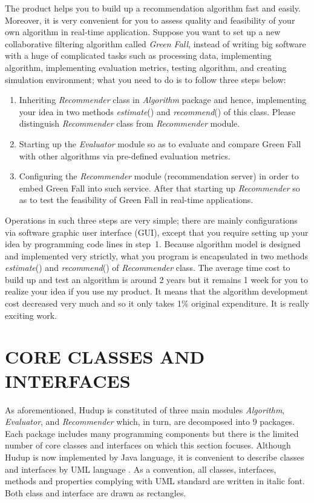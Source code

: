 \documentclass[a4paper,twoside]{article}
\begin{document}
The product helps you to build up a recommendation algorithm fast and easily. Moreover, it is very convenient for you to assess quality and feasibility of your own algorithm in real-time application. Suppose you want to set up a new collaborative filtering algorithm called \textit{Green Fall}, instead of writing big software with a huge of complicated tasks such as processing data, implementing algorithm, implementing evaluation metrics, testing algorithm, and creating simulation environment; what you need to do is to follow three steps below:
\begin{enumerate}
\item Inheriting \textit{Recommender} class in \textit{Algorithm} package and hence, implementing your idea in two methods \textit{estimate}() and \textit{recommend}() of this class. Please distinguish \textit{Recommender} class from \textit{Recommender} module.
\item Starting up the \textit{Evaluator} module so as to evaluate and compare Green Fall with other algorithms via pre-defined evaluation metrics.
\item Configuring the \textit{Recommender} module (recommendation server) in order to embed Green Fall into such service. After that starting up \textit{Recommender} so as to test the feasibility of Green Fall in real-time applications.
\end{enumerate}
Operations in such three steps are very simple; there are mainly configurations via software graphic user interface (GUI), except that you require setting up your idea by programming code lines in step~1. Because algorithm model is designed and implemented very strictly, what you program is encapsulated in two methods \textit{estimate}() and \textit{recommend}() of \textit{Recommender} class. The average time cost to build up and test an algorithm is around 2 years but it remains 1 week for you to realize your idea if you use my product. It means that the algorithm development cost decreased very much and so it only takes 1\% original expenditure. It is really exciting work.

\section{\uppercase{Core Classes and Interfaces}}
\label{sec:classes}
As aforementioned, Hudup is constituted of three main modules \textit{Algorithm}, \textit{Evaluator}, and \textit{Recommender} which, in turn, are decomposed into 9 packages. Each package includes many programming components but there is the limited number of core classes and interfaces on which this section focuses. Although Hudup is now implemented by Java language, it is convenient to describe classes and interfaces by UML language \cite{duong2008}. As a convention, all classes, interfaces, methods and properties complying with UML standard are written in italic font. Both class and interface are drawn as rectangles.
\end{document}
